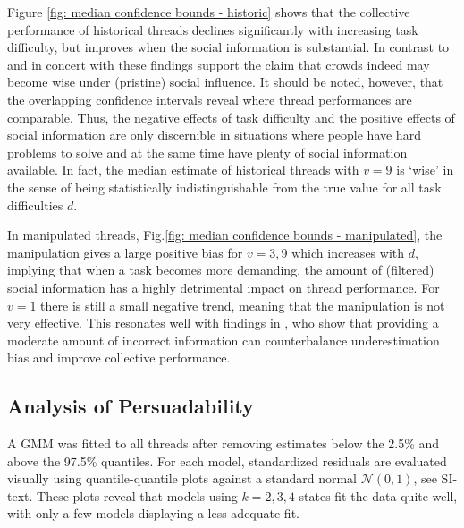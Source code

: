 \documentclass[9pt,a4paper,twocolumn,lineno]{article}
\begin{document}
Figure \ref{fig: median confidence bounds - historic} shows that the collective performance of historical threads declines significantly with increasing task difficulty, but improves when the social information is substantial. In contrast to \cite{lorenz2011social, king2011true, minson2012cost} and in concert with \cite{gurccay2015power, becker2017network, jayles2017social, farrell2011social} these findings support the claim that crowds indeed may become wise under (pristine) social influence. It should be noted, however, that the overlapping confidence intervals reveal where thread performances are comparable. Thus, the negative effects of task difficulty and the positive effects of social information are only discernible in situations where people have hard problems to solve and at the same time have plenty of social information available. In fact, the median estimate of historical threads with $v=9$ is `wise' in the sense of being statistically indistinguishable from the true value for all task difficulties $d$.

In manipulated threads, Fig.\ref{fig: median confidence bounds - manipulated}, the manipulation gives a large positive bias for $v=3,9$ which increases with $d$, implying that when a task becomes more demanding, the amount of (filtered) social information has a highly detrimental impact on thread performance. For $v=1$ there is still a small negative trend, meaning that the manipulation is not very effective. This resonates well with findings in \cite{jayles2017social}, who show that providing a moderate amount of incorrect information can counterbalance underestimation bias and improve collective performance. 

\subsection*{Analysis of Persuadability} 
A GMM was fitted to all threads after removing estimates below the 2.5\% and above the 97.5\% quantiles. For each model, standardized residuals are evaluated visually using quantile-quantile plots against a standard normal $\mathcal{N}(0,1)$, see SI-text. These plots reveal that models using $k=2,3,4$ states fit the data quite well, with only a few models displaying a less adequate fit.
\end{document}
